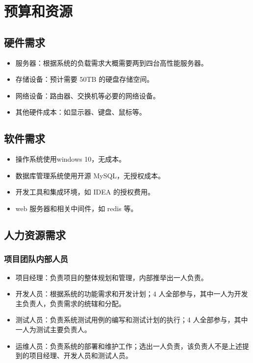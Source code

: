 \documentclass{article}
\begin{document}
\section{预算和资源}
\subsection{硬件需求}
\begin{itemize}
	\item 服务器：根据系统的负载需求大概需要两到四台高性能服务器。
	\item 存储设备：预计需要 50TB 的硬盘存储空间。
	\item 网络设备：路由器、交换机等必要的网络设备。
	\item 其他硬件成本：如显示器、键盘、鼠标等。
\end{itemize}

\subsection{软件需求}
\begin{itemize}
	\item 操作系统使用windows 10，无成本。
	\item 数据库管理系统使用开源 MySQL，无授权成本。
	\item 开发工具和集成环境，如 IDEA 的授权费用。
	\item web 服务器和相关中间件，如 redis 等。
\end{itemize}

\subsection{人力资源需求}
\subsubsection{项目团队内部人员}
\begin{itemize}
	\item 项目经理：负责项目的整体规划和管理，内部推举出一人负责。
	\item 开发人员：根据系统的功能需求和开发计划；4 人全部参与，其中一人为开发主负责人，负责需求的统辖和分配。
	\item 测试人员：负责系统测试用例的编写和测试计划的执行；4 人全部参与，其中一人为测试主要负责人。
	\item 运维人员：负责系统的部署和维护工作；选出一人负责，该负责人不是上述提到的项目经理、开发人员和测试人员。
\end{itemize}
\end{document}
